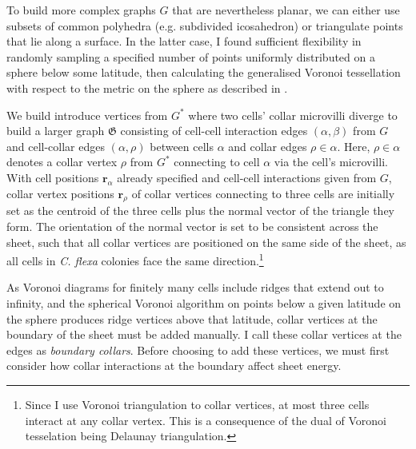 To build more complex graphs $G$ that are nevertheless planar, we can either use subsets of common polyhedra (e.g. subdivided icosahedron) or triangulate points that lie along a surface. In the latter case, I found sufficient flexibility in randomly sampling a specified number of points uniformly distributed on a sphere below some latitude, then calculating the generalised Voronoi tessellation with respect to the metric on the sphere as described in \citet{caroli2010}.

We build introduce vertices from $G^*$ where two cells' collar microvilli diverge to build a larger graph $\mathfrak{G}$ consisting of cell-cell interaction edges $(\alpha, \beta)$ from $G$ and cell-collar edges $(\alpha, \rho)$ between cells $\alpha$ and collar edges $\rho \in \alpha$. Here, $\rho \in \alpha$ denotes a collar vertex $\rho$ from $G^*$ connecting to cell $\alpha$ via the cell's microvilli. With cell positions $\bm{r}_\alpha$ already specified and cell-cell interactions given from $G$, collar vertex positions $\bm{r}_\rho$ of collar vertices connecting to three cells are initially set as the centroid of the three cells plus the normal vector of the triangle they form. The orientation of the normal vector is set to be consistent across the sheet, such that all collar vertices are positioned on the same side of the sheet, as all cells in \textit{C. flexa} colonies face the same direction.\footnote{Since I use Voronoi triangulation to collar vertices, at most three cells interact at any collar vertex. This is a consequence of the dual of Voronoi tesselation being Delaunay triangulation.}

As Voronoi diagrams for finitely many cells include ridges that extend out to infinity, and the spherical Voronoi algorithm on points below a given latitude on the sphere produces ridge vertices above that latitude, collar vertices at the boundary of the sheet must be added manually. I call these collar vertices at the edges as \textit{boundary collars}. Before choosing to add these vertices, we must first consider how collar interactions at the boundary affect sheet energy.


